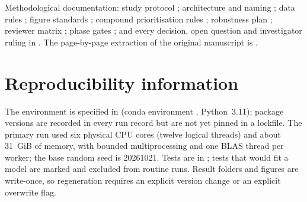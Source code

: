 Methodological documentation: study protocol ; architecture and naming
; data rules ; figure standards
; compound prioritisation rules ;
robustness plan ; reviewer matrix
; phase gates ; and every decision,
open question and investigator ruling in . The page-by-page
extraction of the original manuscript is .

\section{Reproducibility information}\label{app:reproducibility}

The environment is specified in  (conda environment
, Python~3.11); package versions are recorded in every
run record but are not yet pinned in a lockfile. The primary run used six physical CPU cores
(twelve logical threads) and about 31~GiB of memory, with bounded multiprocessing and one BLAS
thread per worker; the base random seed is 20261021. Tests are in ; tests that
would fit a model are marked  and excluded from routine runs. Result folders
and figures are write-once, so regeneration requires an explicit version change or an explicit
overwrite flag.

